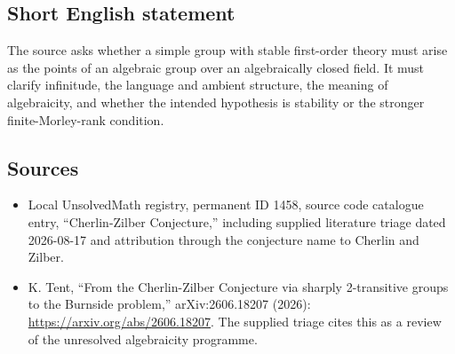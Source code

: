 \documentclass[11pt]{article}
\begin{document}
\subsection{Short English statement}
The source asks whether a simple group with stable first-order theory must arise as the points of an algebraic group over an algebraically closed field. It must clarify infinitude, the language and ambient structure, the meaning of algebraicity, and whether the intended hypothesis is stability or the stronger finite-Morley-rank condition.
\subsection{Sources}
\begin{itemize}
\item Local UnsolvedMath registry, permanent ID 1458, source code catalogue entry, ``Cherlin-Zilber Conjecture,'' including supplied literature triage dated 2026-08-17 and attribution through the conjecture name to Cherlin and Zilber.
\item K. Tent, ``From the Cherlin-Zilber Conjecture via sharply 2-transitive groups to the Burnside problem,'' arXiv:2606.18207 (2026): \url{https://arxiv.org/abs/2606.18207}. The supplied triage cites this as a review of the unresolved algebraicity programme.
\end{itemize}
\end{document}
